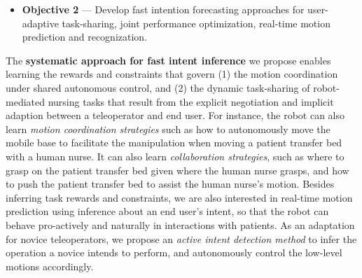 \documentclass[letterpaper, 11 pt, onecolumn]{article}
\begin{document}
\begin{itemize}
\item \textbf{Objective 2} --- Develop fast intention forecasting approaches for user-adaptive task-sharing, joint performance optimization, real-time motion prediction and recognization. 
\end{itemize}

\noindent
The \textbf{systematic approach for fast intent inference} we propose enables learning the rewards and constraints that govern (1) the motion coordination under shared autonomous control, and (2) the dynamic task-sharing of robot-mediated nursing tasks that result from the explicit negotiation and implicit adaption between a teleoperator and end user. For instance, the robot can also learn \textit{motion coordination strategies} such as how to autonomously move the mobile base to facilitate the manipulation when moving a patient transfer bed with a human nurse. It can also learn \textit{collaboration strategies}, such as where to grasp on the patient transfer bed given where the human nurse grasps, and how to push the patient transfer bed to assist the human nurse's motion. Besides inferring task rewards and constraints, we are also interested in real-time motion prediction using inference about an end user's intent, so that the robot can behave pro-actively and naturally in interactions with patients. As an adaptation for novice teleoperators, we propose an \textit{active intent detection method} to infer the operation a novice intends to perform, and autonomously control the low-level motions accordingly.


\end{document}
